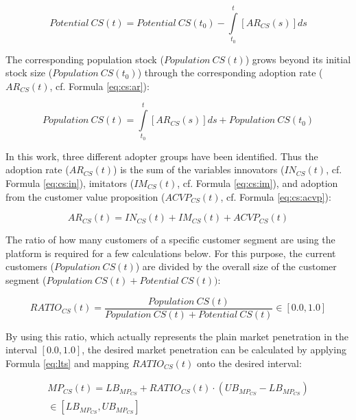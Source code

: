 \begin{equation}\label{eq:cs:pot}
	\mathit{Potential~CS(t)} =\mathit{Potential~CS(t_0)} - \int\limits_{t_0}^t  [AR_{CS}(s)]ds
\end{equation}

The corresponding population stock ($\mathit{Population~CS(t)}$) grows beyond its initial stock size ($\mathit{Population~CS(t_0)}$) through the corresponding adoption rate ($AR_{CS}(t)$, cf. Formula \ref{eq:cs:ar}):

\begin{equation}\label{eq:cs:pop}
	\mathit{Population~CS(t)} = \int\limits_{t_0}^t [AR_{CS}(s)]ds + \mathit{Population~CS(t_0)}
\end{equation}

In this work, three different adopter groups have been identified. Thus the adoption rate ($AR_{CS}(t)$) is the sum of the variables innovators ($IN_{CS}(t)$, cf. Formula \ref{eq:cs:in}), imitators ($IM_{CS}(t)$, cf. Formula \ref{eq:cs:im}), and adoption from the customer value proposition ($ACVP_{CS}(t)$, cf. Formula \ref{eq:cs:acvp}):

\begin{equation}\label{eq:cs:ar}
		AR_{CS}(t) = IN_{CS}(t) + IM_{CS}(t) + ACVP_{CS}(t)	
\end{equation}

The ratio of how many customers of a specific customer segment are using the platform is required for a few calculations below. For this purpose, the current customers ($\mathit{Population~CS(t)}$) are divided by the overall size of the customer segment ($\mathit{Population~CS(t)} + \mathit{Potential~CS(t)})$:

\begin{equation}\label{eq:cs:ratio}
		RATIO_{CS}(t) = \frac{\mathit{Population~CS(t)}}{\mathit{Population~CS(t)} + \mathit{Potential~CS(t)}} \in [0.0,1.0]
\end{equation}

By using this ratio, which actually represents the plain market penetration in the interval $[0.0,1.0]$, the desired market penetration can be calculated by applying Formula \ref{eq:lts} and mapping $RATIO_{CS}(t)$ onto the desired interval:

\begin{eqnarray}\label{eq:cs:mp}
	MP_{CS}(t) = LB_{MP_{CS}} + RATIO_{CS}(t) \cdot (UB_{MP_{CS}} - LB_{MP_{CS}})  \nonumber \\ \in [LB_{MP_{CS}},UB_{MP_{CS}}]
\end{eqnarray}

